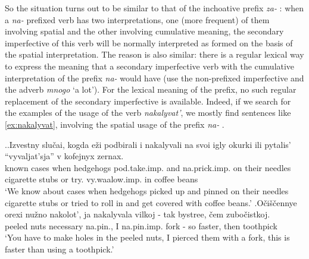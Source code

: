 So the situation turns out to be similar to that of the inchoative  prefix \textit{za-}  : when a \textit{na-}  prefixed verb has two interpretations, one (more frequent) of them involving spatial  and the other involving cumulative  meaning, the secondary imperfective  of this verb will be normally interpreted as formed on the basis of the spatial  interpretation. The reason is also similar: there is a regular lexical way to express the meaning that a secondary imperfective  verb  with the cumulative  interpretation of the prefix \textit{na-}   would have (use the non-prefixed imperfective and the adverb \textit{mnogo} `a lot'). For the lexical meaning of the prefix, no such regular replacement of the secondary imperfective  is available. Indeed, if we search for the examples of the usage of the verb \textit{nakalyvat'}, we mostly find sentences like \ref{ex:nakalyvat}, involving the spatial  usage of the prefix \textit{na-}  . 

\ex.\label{ex:nakalyvat}\ag.Izvestny slu\v{c}ai, kogda e\v{z}i podbirali i nakalyvali na svoi igly okurki ili pytalis' ``vyvaljat'sja'' v kofejnyx zernax.\\
known cases when hedgehogs pod.take.imp. and na.prick.imp. on their needles {cigarette stubs} or try. vy.waalow.imp. in coffee beans\\
\trans `We know about cases when hedgehogs picked up and pinned on their needles cigarette stubs or tried to roll in and get covered with coffee beans.'
\bg.O\v{c}i\v{s}\v{c}ennye orexi nu\v{z}no nakolot', ja nakalyvala vilkoj - tak bystree, \v{c}em zubo\v{c}istkoj.\\
peeled nuts necessary na.pin., I na.pin.imp. fork - so faster, then toothpick\\
\trans `You have to make holes in the peeled nuts, I pierced them with a fork, this is faster than using a toothpick.'\\

